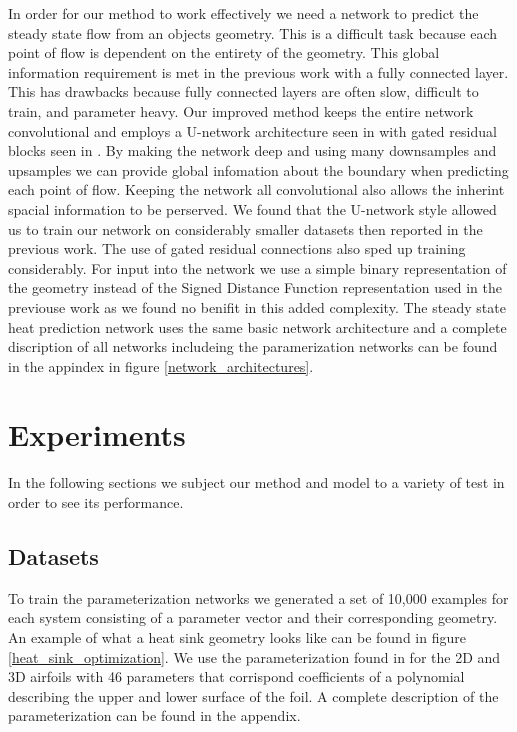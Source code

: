 \documentclass{article} %
\begin{document}
In order for our method to work effectively we need a network to predict the steady state flow from an objects geometry. This is a difficult task because each point of flow is dependent on the entirety of the geometry. This global information requirement is met in the previous work \citep{guo2016convolutional} with a fully connected layer. This has drawbacks because fully connected layers are often slow, difficult to train, and parameter heavy. Our improved method keeps the entire network convolutional and employs a U-network architecture seen in \citep{DBLP:journals/corr/RonnebergerFB15} with gated residual blocks seen in \citep{salimans2017pixelcnn++}. By making the network deep and using many downsamples and upsamples we can provide global infomation about the boundary when predicting each point of flow. Keeping the network all convolutional also allows the inherint spacial information to be perserved. We found that the U-network style allowed us to train our network on considerably smaller datasets then reported in the previous work. The use of gated residual connections also sped up training considerably. For input into the network we use a simple binary representation of the geometry instead of the Signed Distance Function representation used in the previouse work as we found no benifit in this added complexity. The steady state heat prediction network uses the same basic network architecture and a complete discription of all networks includeing the paramerization networks can be found in the appindex in figure \ref{network_architectures}.

\section{Experiments}

In the following sections we subject our method and model to a variety of test in order to see its performance.

\subsection{Datasets}

To train the parameterization networks we generated a set of 10,000 examples for each system consisting of a parameter vector and their corresponding geometry. An example of what a heat sink geometry looks like can be found in figure \ref{heat_sink_optimization}. We use the parameterization found in \cite{lane2009surface} for the 2D and 3D airfoils with 46 parameters that corrispond coefficients of a polynomial describing the upper and lower surface of the foil. A complete description of the parameterization can be found in the appendix.
\end{document}
